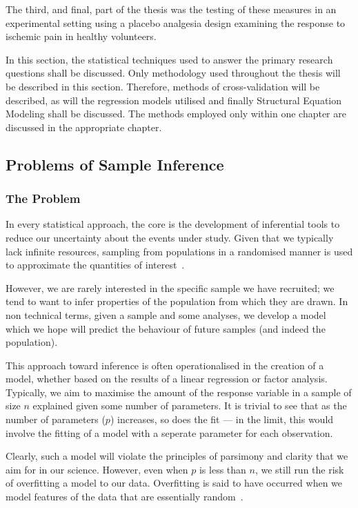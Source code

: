 The third, and final, part of the thesis was the testing of these measures in an experimental setting using a placebo analgesia design examining the response to ischemic pain in healthy volunteers. 


In this section, the statistical techniques used to answer the primary research questions shall be discussed. Only methodology used throughout the thesis will be described in this section. Therefore, methods of cross-validation will be described, as will the regression models utilised and finally Structural Equation Modeling shall be discussed. The methods employed only within one chapter are discussed in the appropriate chapter. 

\subsection{Problems of Sample Inference}
\label{sec:probl-sample-infer}
\subsubsection{The Problem}

In every statistical approach, the core is the development of inferential tools to reduce our uncertainty about the events under study\cite{gelman2010philosophy}. Given that we typically lack infinite resources, sampling from populations in a randomised manner is used to approximate the quantities of interest~\cite{venables2002modern}.

However, we are rarely interested in the specific sample we have recruited; we tend to want to infer properties of the population  from which they are drawn.  In non technical terms, given a sample and some analyses, we develop a model which we hope will predict the behaviour of future samples (and indeed the population).

This approach toward inference is often operationalised in the creation of a model, whether based on the results of a linear regression or factor analysis. Typically, we aim to maximise the amount of the response variable  in a sample of size $n$ explained given some number of parameters. It is trivial to see that as the number of parameters ($p$) increases, so does the fit --- in the limit, this would involve the fitting of a model with a seperate parameter for each observation. 

Clearly, such a model will violate the principles of parsimony and clarity that we aim for in our science. However, even when $p$ is less than $n$, we still run the risk of overfitting a model to our data. Overfitting is said to have occurred when we model features of the data that are essentially random~\cite{friedman2009elements}. 

